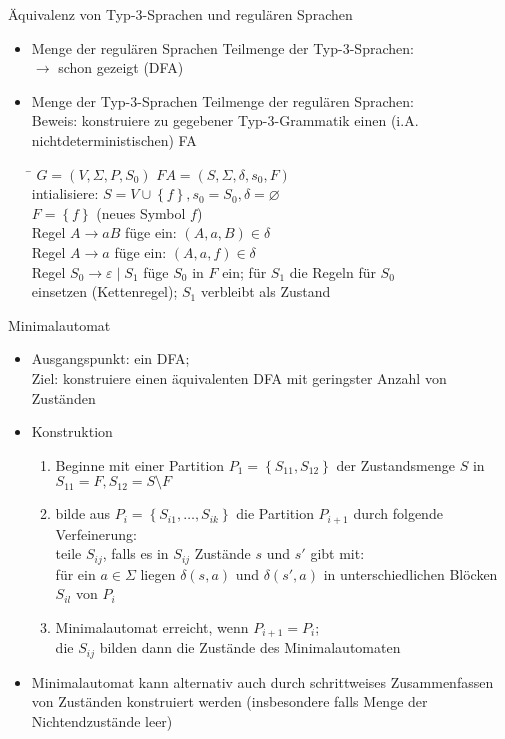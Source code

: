 \begin{frame}{Äquivalenz von Typ-3-Sprachen und regulären Sprachen}
	\begin{itemize}
		\item Menge der regulären Sprachen Teilmenge der Typ-3-Sprachen:\\
		\quad $\rightarrow$ schon gezeigt (DFA)
		\item Menge der Typ-3-Sprachen Teilmenge der regulären Sprachen:\\
		Beweis: konstruiere zu gegebener Typ-3-Grammatik einen (i.A. nichtdeterministischen) FA\\
		\begin{tabbing}
			\hspace{5cm}\=\kill
		$G=(V,\Sigma, P, S_0)$	\> $FA=(S, \Sigma, \delta, s_0, F)$\\ 
			\> intialisiere: $S=V \cup \left\{f\right\}, s_0=S_0, \delta=\varnothing$\\ 
			\> $F=\left\{f\right\}$ (neues Symbol $f$)\\ 
		Regel $A \rightarrow aB$	\> füge ein: $(A, a, B) \in \delta$\\ 
		Regel $A \rightarrow a$	\> füge ein: $(A, a, f) \in \delta$\\ 
		Regel $S_0 \rightarrow \varepsilon \mid S_1$	\> füge $S_0$ in $F$ ein; für $S_1$ die Regeln für $S_0$\\ 
			\> einsetzen (Kettenregel); $S_1$ verbleibt als Zustand
		\end{tabbing} 
	\end{itemize}
\end{frame}

\begin{frame}{Minimalautomat}
	\begin{itemize}
		\item Ausgangspunkt: ein DFA;\\
		Ziel: konstruiere einen äquivalenten DFA mit geringster Anzahl von Zuständen
		\item Konstruktion
		\begin{enumerate}
			\item Beginne mit einer Partition $P_1=\left\{S_{11}, S_{12}\right\}$ der Zustandsmenge $S$ in $S_{11}=F, S_{12}=S \setminus F$
			\item bilde aus $P_i=\left\{S_{i1},\ldots,S_{ik}\right\}$ die Partition $P_{i+1}$ durch folgende Verfeinerung:\\
			teile $S_{ij}$, falls es in $S_{ij}$ Zustände $s$ und $s'$ gibt mit:\\
			für ein $a \in \Sigma$ liegen $\delta(s, a)$ und $\delta(s', a)$ in unterschiedlichen Blöcken $S_{il}$ von $P_i$
			\item Minimalautomat erreicht, wenn $P_{i+1}=P_i$;\\
			die $S_{ij}$ bilden dann die Zustände des Minimalautomaten
		\end{enumerate}
		\item Minimalautomat kann alternativ auch durch schrittweises Zusammenfassen von Zuständen konstruiert werden (insbesondere falls Menge der Nichtendzustände leer)
	\end{itemize}
\end{frame}


